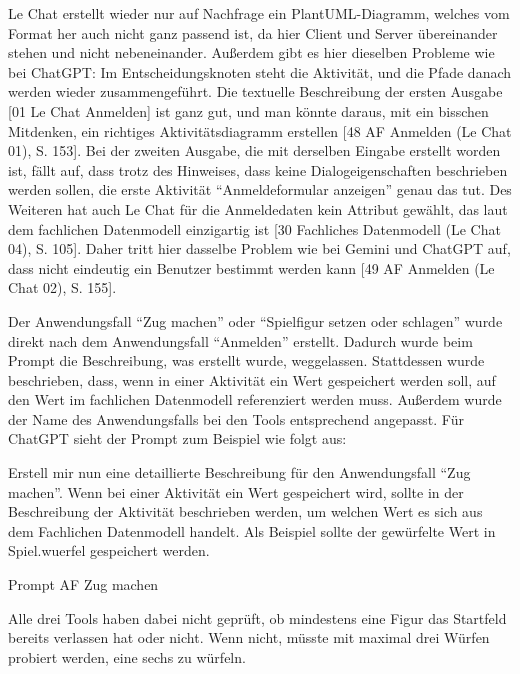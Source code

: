 Le Chat erstellt wieder nur auf Nachfrage ein PlantUML-Diagramm, welches vom Format her auch nicht ganz passend ist, da hier Client und 
Server übereinander stehen und nicht nebeneinander. Außerdem gibt es hier dieselben Probleme wie bei ChatGPT: Im Entscheidungsknoten steht 
die Aktivität, und die Pfade danach werden wieder zusammengeführt. Die textuelle Beschreibung der ersten Ausgabe [01 Le Chat Anmelden] ist 
ganz gut, und man könnte daraus, mit ein bisschen Mitdenken, ein richtiges Aktivitätsdiagramm erstellen [48 AF Anmelden (Le Chat 01), S. 153]. 
Bei der zweiten Ausgabe, die mit derselben Eingabe erstellt worden ist, fällt auf, dass trotz des Hinweises, dass keine Dialogeigenschaften 
beschrieben werden sollen, die erste Aktivität ``Anmeldeformular anzeigen'' genau das tut. Des Weiteren hat auch Le Chat für die Anmeldedaten 
kein Attribut gewählt, das laut dem fachlichen Datenmodell einzigartig ist [30 Fachliches Datenmodell (Le Chat 04), S. 105]. Daher tritt hier 
dasselbe Problem wie bei Gemini und ChatGPT auf, dass nicht eindeutig ein Benutzer bestimmt werden kann [49 AF Anmelden (Le Chat 02), S. 155].

Der Anwendungsfall ``Zug machen'' oder ``Spielfigur setzen oder schlagen'' wurde direkt nach dem Anwendungsfall ``Anmelden'' erstellt. Dadurch wurde 
beim Prompt die Beschreibung, was erstellt wurde, weggelassen. Stattdessen wurde beschrieben, dass, wenn in einer Aktivität ein Wert gespeichert 
werden soll, auf den Wert im fachlichen Datenmodell referenziert werden muss. Außerdem wurde der Name des Anwendungsfalls bei den Tools 
entsprechend angepasst. Für ChatGPT sieht der Prompt zum Beispiel wie folgt aus:

\begin{prompt}[H]
    \begin{tcolorbox}[colback=gray!20, colframe=gray!20, boxrule=0pt, sharp corners] 
        Erstell mir nun eine detaillierte Beschreibung für den Anwendungsfall ``Zug machen''. Wenn bei einer Aktivität ein Wert gespeichert wird, sollte 
        in der Beschreibung der Aktivität beschrieben werden, um welchen Wert es sich aus dem Fachlichen Datenmodell handelt. Als Beispiel sollte der 
        gewürfelte Wert in Spiel.wuerfel gespeichert werden.
        \vfill
    \end{tcolorbox}
    \caption{Prompt AF Zug machen}
    \label{Prompt AF Zug Machen}
\end{prompt}

Alle drei Tools haben dabei nicht geprüft, ob mindestens eine Figur das Startfeld bereits verlassen hat oder nicht. Wenn nicht, müsste mit maximal 
drei Würfen probiert werden, eine sechs zu würfeln.

